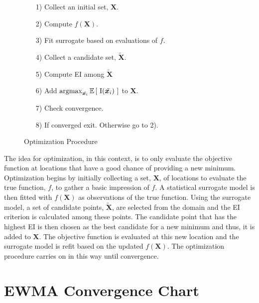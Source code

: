 \documentclass[12pt]{article}
\newcommand{\E}[1]{
        \mathbb{E}\left[~#1~\right]
}
\newcommand{\argmax}{\operatornamewithlimits{argmax}}
\def \Eix {
	\mathbb{E}\left[~\text{I}(\bm{x})~\right]
}
\begin{document}
%
%
\begin{figure}
	\vspace{-1.6cm}
	\singlespacing
	\caption{Optimization Procedure}
	\begin{itemize}
	\item[1)] Collect an initial set, $\bm{X}$.
	\item[2)] Compute $f(\bm{X})$.
	\item[3)] Fit surrogate based on evaluations of $f$.
	\item[4)] Collect a candidate set, $\tilde{\bm{X}}$.
	\item[5)] Compute EI among $\tilde{\bm{X}}$
	\item[6)] Add $\argmax_{\tilde{\bm{x}_i}} \E{\text{I}(\tilde{\bm{x}_i})}$ to $\bm{X}$.
	\item[7)] Check convergence.
	\item[8)] If converged exit. Otherwise go to 2).
	\end{itemize}
	\doublespacing
	\label{procedure}
\end{figure}
%
%

The idea for optimization, in this context, is to only evaluate the objective function at locations that have a good chance of providing a new minimum. 
Optimization begins by initially collecting a set, $\bm{X}$, of locations to evaluate the true function, $f$, to gather a basic impression of $f$.
A statistical surrogate model is then fitted with $f(\bm{X})$ as observations of the true function.
Using the surrogate model, a set of candidate points, $\tilde{\bm{X}}$, are selected from the domain and the EI criterion is calculated among these points.
%
The candidate point that has the highest EI is then chosen as the best candidate for a new minimum and thus, it is added to $\bm{X}$.
The objective function is evaluated at this new location and the surrogate model is refit based on the updated $f(\bm{X})$.
%
The optimization procedure carries on in this way until convergence.

%
%
\section{EWMA Convergence Chart}
%
%
\end{document}
